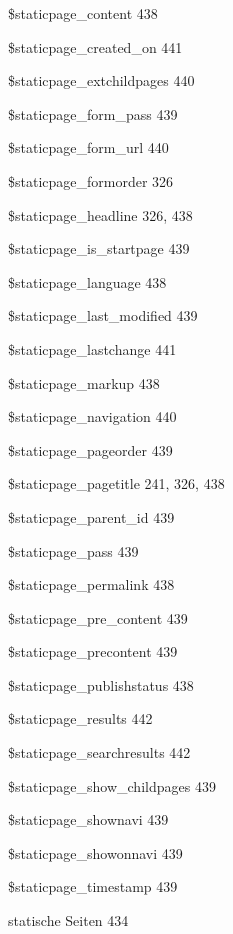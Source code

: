 \documentclass{book}
\renewcommand\subitem{\par}
\begin{document}
\begin{multicols}{2}
\begin{osp-index}
    \subitem \$staticpage\_content\hspace{1mm} 438
    \subitem \$staticpage\_created\_on\hspace{1mm} 441
    \subitem \$staticpage\_extchildpages\hspace{1mm} 440
    \subitem \$staticpage\_form\_pass\hspace{1mm} 439
    \subitem \$staticpage\_form\_url\hspace{1mm} 440
    \subitem \$staticpage\_formorder\hspace{1mm} 326
    \subitem \$staticpage\_headline\hspace{1mm} 326, 438
    \subitem \$staticpage\_is\_startpage\hspace{1mm} 439
    \subitem \$staticpage\_language\hspace{1mm} 438
    \subitem \$staticpage\_last\_modified\hspace{1mm} 439
    \subitem \$staticpage\_lastchange\hspace{1mm} 441
    \subitem \$staticpage\_markup\hspace{1mm} 438
    \subitem \$staticpage\_navigation\hspace{1mm} 440
    \subitem \$staticpage\_pageorder\hspace{1mm} 439
    \subitem \$staticpage\_pagetitle\hspace{1mm} 241, 326, 438
    \subitem \$staticpage\_parent\_id\hspace{1mm} 439
    \subitem \$staticpage\_pass\hspace{1mm} 439
    \subitem \$staticpage\_permalink\hspace{1mm} 438
    \subitem \$staticpage\_pre\_content\hspace{1mm} 439
    \subitem \$staticpage\_precontent\hspace{1mm} 439
    \subitem \$staticpage\_publishstatus\hspace{1mm} 438
    \subitem \$staticpage\_results\hspace{1mm} 442
    \subitem \$staticpage\_searchresults\hspace{1mm} 442
    \subitem \$staticpage\_show\_childpages\hspace{1mm} 439
    \subitem \$staticpage\_shownavi\hspace{1mm} 439
    \subitem \$staticpage\_showonnavi\hspace{1mm} 439
    \subitem \$staticpage\_timestamp\hspace{1mm} 439
    \subitem statische Seiten\hspace{1mm} 434

\end{osp-index}
\end{multicols}
\end{document}
